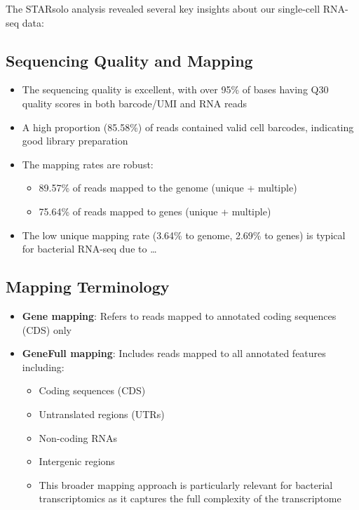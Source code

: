 \documentclass[
  11pt,
  a4paper,
]{report}
\providecommand{\tightlist}{%
  \setlength{\itemsep}{0pt}\setlength{\parskip}{0pt}}\usepackage{longtable,booktabs,array}
\begin{document}
The STARsolo analysis revealed several key insights about our
single-cell RNA-seq data:

\subsection{Sequencing Quality and
Mapping}\label{sequencing-quality-and-mapping}

\begin{itemize}
\tightlist
\item
  The sequencing quality is excellent, with over 95\% of bases having
  Q30 quality scores in both barcode/UMI and RNA reads
\item
  A high proportion (85.58\%) of reads contained valid cell barcodes,
  indicating good library preparation
\item
  The mapping rates are robust:

  \begin{itemize}
  \tightlist
  \item
    89.57\% of reads mapped to the genome (unique + multiple)
  \item
    75.64\% of reads mapped to genes (unique + multiple)
  \end{itemize}
\item
  The low unique mapping rate (3.64\% to genome, 2.69\% to genes) is
  typical for bacterial RNA-seq due to \ldots{}
\end{itemize}

\subsection{Mapping Terminology}\label{mapping-terminology}

\begin{itemize}
\tightlist
\item
  \textbf{Gene mapping}: Refers to reads mapped to annotated coding
  sequences (CDS) only
\item
  \textbf{GeneFull mapping}: Includes reads mapped to all annotated
  features including:

  \begin{itemize}
  \tightlist
  \item
    Coding sequences (CDS)
  \item
    Untranslated regions (UTRs)
  \item
    Non-coding RNAs
  \item
    Intergenic regions
  \item
    This broader mapping approach is particularly relevant for bacterial
    transcriptomics as it captures the full complexity of the
    transcriptome
  \end{itemize}
\end{itemize}
\end{document}
